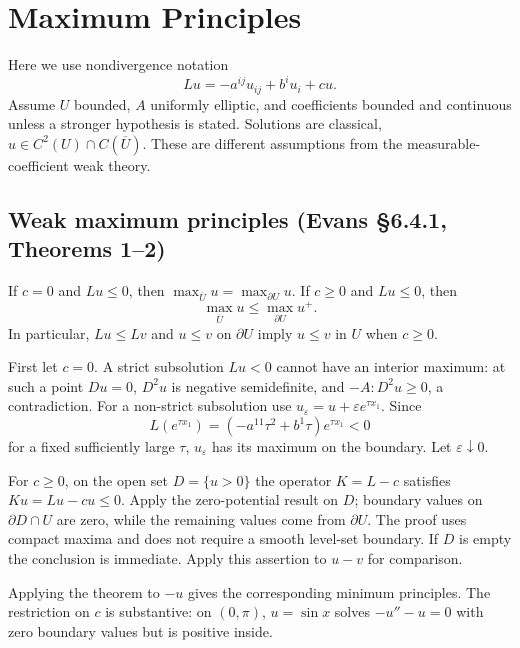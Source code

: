 \Needspace{65mm}
\section{Maximum Principles}
\label{sec:6-4}
Here we use nondivergence notation
\[
 Lu=-a^{ij}u_{ij}+b^iu_i+cu.
\]
Assume $U$ bounded, $A$ uniformly elliptic, and coefficients bounded and
continuous unless a stronger hypothesis is stated.
Solutions are classical, $u\in C^2(U)\cap C(\overline U)$.
These are different assumptions from the measurable-coefficient weak theory.

\subsection{Weak maximum principles (Evans \S6.4.1, Theorems 1--2)}
\begin{theorem}\label{thm:6-weak-max}
If $c=0$ and $Lu\leq0$, then
$\max_{\overline U}u=\max_{\partial U}u$.
If $c\geq0$ and $Lu\leq0$, then
\[
 \max_{\overline U}u\leq\max_{\partial U}u^+.
\]
In particular, $Lu\leq Lv$ and $u\leq v$ on $\partial U$ imply $u\leq v$
in $U$ when $c\geq0$.
\end{theorem}
\Needspace{45mm}
\begin{expandedproof}
First let $c=0$. A strict subsolution $Lu<0$ cannot have an interior
maximum: at such a point $Du=0$, $D^2u$ is negative semidefinite,
and $-A:D^2u\geq0$, a contradiction.
For a non-strict subsolution use $u_\varepsilon=u+\varepsilon e^{\tau x_1}$.
Since
\[
 L(e^{\tau x_1})=(-a^{11}\tau^2+b^1\tau)e^{\tau x_1}<0
\]
for a fixed sufficiently large $\tau$, $u_\varepsilon$ has its maximum
on the boundary. Let $\varepsilon\downarrow0$.

For $c\geq0$, on the open set $D=\{u>0\}$ the operator
$K=L-c$ satisfies $Ku=Lu-cu\leq0$.
Apply the zero-potential result on $D$; boundary values on
$\partial D\cap U$ are zero, while the remaining values come from
$\partial U$. The proof uses compact maxima and does not require a
smooth level-set boundary. If $D$ is empty the conclusion is immediate.
Apply this assertion to $u-v$ for comparison.
\end{expandedproof}
Applying the theorem to $-u$ gives the corresponding minimum principles.
The restriction on $c$ is substantive: on $(0,\pi)$,
$u=\sin x$ solves $-u''-u=0$ with zero boundary values but is positive inside.

